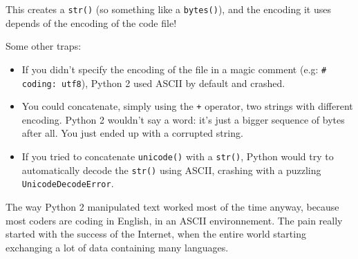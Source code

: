 This creates a \lstinline{str()} (so something like a \lstinline{bytes()}), and the encoding it uses depends of the encoding of the code file!

Some other traps:

\begin{itemize}
    \item If you didn't specify the encoding of the file in a magic comment (e.g: \lstinline{# coding: utf8}), Python 2 used ASCII by default and crashed.
    \item You could concatenate, simply using the \lstinline{+} operator, two strings with different encoding. Python 2 wouldn't say a word: it's just a bigger sequence of bytes after all. You just ended up with a corrupted string.
    \item If you tried to concatenate \lstinline{unicode()} with a \lstinline{str()}, Python would try to automatically decode the \lstinline{str()} using ASCII, crashing with a puzzling \lstinline{UnicodeDecodeError}.
\end{itemize}

The way Python 2 manipulated text worked most of the time anyway, because most coders are coding in English, in an ASCII environnement. The pain really started with the success of the Internet, when the entire world starting exchanging a lot of data containing many languages.

